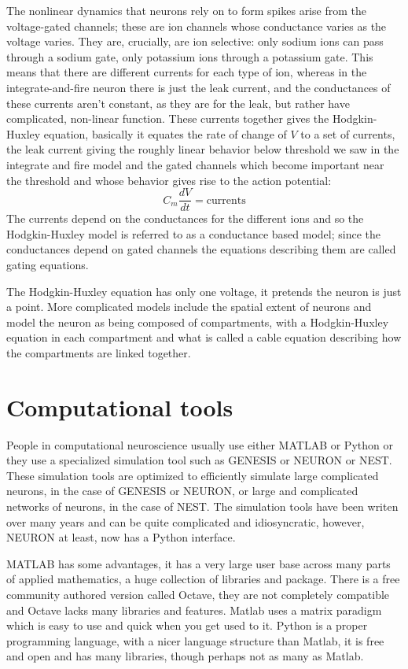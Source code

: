 \documentclass[11pt,a4paper]{scrartcl}
\begin{document}
The nonlinear dynamics that neurons rely on to form spikes arise from
the voltage-gated channels; these are ion channels whose
conductance varies as the voltage varies. They are, crucially, are ion
selective: only sodium ions can pass through a sodium gate, only
potassium ions through a potassium gate. This means that there are
different currents for each type of ion, whereas in the
integrate-and-fire neuron there is just the leak current, and the
conductances of these currents aren't constant, as they are for the
leak, but rather have complicated, non-linear function.  These
currents together gives the Hodgkin-Huxley equation, basically it
equates the rate of change of $V$ to a set of currents, the leak
current giving the roughly linear behavior below threshold we saw in
the integrate and fire model and the gated channels which become
important near the threshold and whose behavior gives rise to the
action potential:
\begin{equation}
C_m\frac{dV}{dt}=\mbox{currents}
\end{equation}
The currents depend on the conductances for the different ions and so
the Hodgkin-Huxley model is referred to as a conductance based model;
since the conductances depend on gated channels the equations
describing them are called gating equations.

The Hodgkin-Huxley equation has only one voltage, it pretends the
neuron is just a point. More complicated models include the spatial
extent of neurons and model the neuron as being composed of
compartments, with a Hodgkin-Huxley equation in each compartment and
what is called a cable equation describing how the compartments are
linked together.

\section*{Computational tools}

People in computational neuroscience usually use either MATLAB or
Python or they use a specialized simulation tool such as GENESIS or
NEURON or NEST. These simulation tools are optimized to efficiently
simulate large complicated neurons, in the case of GENESIS or NEURON,
or large and complicated networks of neurons, in the case of NEST. The
simulation tools have been writen over many years and can be quite
complicated and idiosyncratic, however, NEURON at least, now has a
Python interface. 

MATLAB has some advantages, it has a very large user base across many
parts of applied mathematics, a huge collection of libraries and
package. There is a free community authored version called Octave,
they are not completely compatible and Octave lacks many libraries and
features. Matlab uses a matrix paradigm which is easy to use and quick
when you get used to it. Python is a proper programming language, with
a nicer language structure than Matlab, it is free and open and has
many libraries, though perhaps not as many as Matlab.
\end{document}

